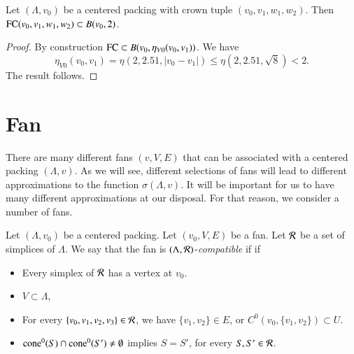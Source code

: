 \begin{lemma}
Let $(\Lambda,v_0)$ be a centered packing with crown tuple $(v_0,v_1,w_1,w_2)$.   Then
${\operatorname{FC}}(v_0,v_1,w_1,w_2)\subset B(v_0,2)$.
\end{lemma}

\begin{proof}
By construction ${\operatorname{FC}}\subset B(v_0,\eta_{V0}(v_0,v_1))$.
We have
   $$\eta_{V0}(v_0,v_1) = \eta(2,2.51,|v_0-v_1|) \le \eta(2,2.51,\sqrt8) < 2.$$
The result follows.
\end{proof}





\section{Fan}

There are many different fans $(v,V,E)$ that
can be associated with a centered packing $(\Lambda,v)$.
As we will see, different selections of fans
will lead to different approximations to the function $\sigma(\Lambda,v)$.
It will be important for us to have many different approximations
at our disposal.  For that reason, we consider a number of
fans.

\begin{definition}\label{def:compatible}
Let $(\Lambda,v_0)$ be a centered packing.
Let $(v_0,V,E)$ be a fan.  Let ${\mathcal R}$ be a set of simplices of $\Lambda$.  
We say that the fan is
$(\Lambda,{\mathcal R})$-{\it compatible} if
if 
\begin{itemize}
\item Every simplex of ${\mathcal R}$ has a vertex at $v_0$.
\item
 $V\subset \Lambda$, 
\item For every $\{v_0,v_1,v_2,v_3\}\in{\mathcal R}$, we have $\{v_1,v_2\}\in E$, or $C^0(v_0,\{v_1,v_2\})\subset U$.
\item ${\operatorname{cone}}^0(S)\cap{\operatorname{cone}}^0(S')\ne\emptyset$ implies $S=S'$, for every $S,S'\in {\mathcal R}$.
\end{itemize}
\end{definition}

